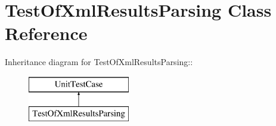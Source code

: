 \hypertarget{class_test_of_xml_results_parsing}{
\section{TestOfXmlResultsParsing Class Reference}
\label{class_test_of_xml_results_parsing}
}
Inheritance diagram for TestOfXmlResultsParsing::\begin{figure}[H]
\begin{center}
\leavevmode
\includegraphics[height=2cm]{class_test_of_xml_results_parsing}
\end{center}
\end{figure}
